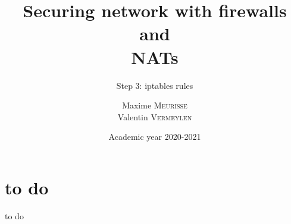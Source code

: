 \documentclass[a4paper, 12pt]{article}
\institute{University of Liège}
\title{Securing network with firewalls and\\NATs}
\subtitle{Step 3: iptables rules}
\author{Maxime \textsc{Meurisse}\\Valentin \textsc{Vermeylen}}
\date{Academic year 2020-2021}
\begin{document}
	\maketitle
	
	\section{to do}
	
	to do
\end{document}

